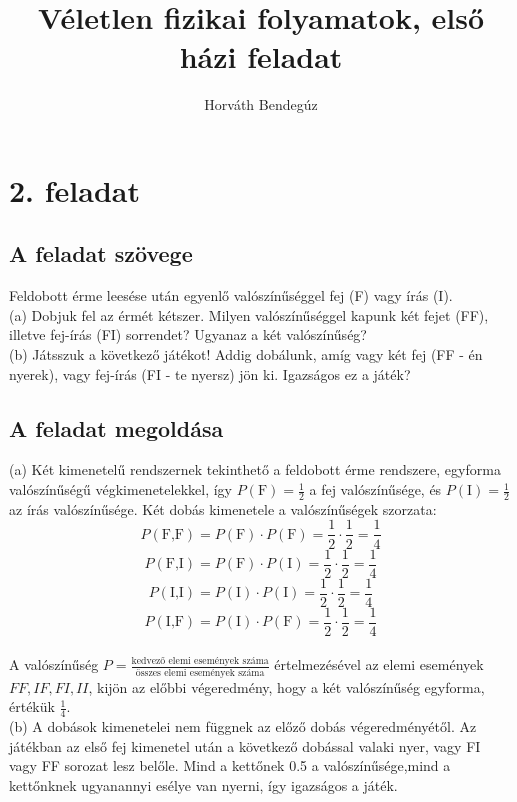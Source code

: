 \documentclass[12pt]{article}
\title{Véletlen fizikai folyamatok, első házi feladat}
\author{Horváth Bendegúz}
\begin{document}
 
 
\maketitle

\section*{2. feladat}
\subsection*{A feladat szövege}
Feldobott érme leesése után egyenlő valószínűséggel fej (F) vagy írás (I).
\\
(a) Dobjuk fel az érmét kétszer. Milyen valószínűséggel kapunk két fejet (FF), illetve fej-írás (FI) sorrendet? Ugyanaz a két valószínűség?
\\ 
(b) Játsszuk a következő játékot! Addig dobálunk, amíg vagy két fej (FF - én nyerek), vagy fej-írás (FI - te nyersz) jön ki. Igazságos ez a játék?
\subsection*{A feladat megoldása}
(a) Két kimenetelű rendszernek tekinthető a feldobott érme rendszere, egyforma valószínűségű végkimenetelekkel, így $P(\text{F}) = \frac{1}{2} $ a fej valószínűsége, és  $P(\text{I}) = \frac{1}{2} $ az írás valószínűsége. Két dobás kimenetele a valószínűségek szorzata: $$P(\text{F,F}) = P(\text{F})\cdot P(\text{F}) = \frac{1}{2}\cdot \frac{1}{2} = \frac{1}{4} $$
$$P(\text{F,I}) = P(\text{F})\cdot P(\text{I}) = \frac{1}{2}\cdot \frac{1}{2} = \frac{1}{4} $$
$$P(\text{I,I}) = P(\text{I})\cdot P(\text{I}) = \frac{1}{2}\cdot \frac{1}{2} = \frac{1}{4} $$
$$P(\text{I,F}) = P(\text{I})\cdot P(\text{F}) = \frac{1}{2}\cdot \frac{1}{2} = \frac{1}{4} $$
\\
A valószínűség $P = \frac{\text{kedvező elemi események száma}}{\text{összes elemi események száma}}$ értelmezésével az elemi események ${FF, IF, FI, II}$, kijön az előbbi végeredmény, hogy a két valószínűség egyforma, értékük $\frac{1}{4}$.\\
(b) A dobások kimenetelei nem függnek az előző dobás végeredményétől. Az játékban az első fej kimenetel után a következő dobással valaki nyer, vagy FI vagy FF sorozat lesz belőle. Mind a kettőnek 0.5 a valószínűsége,mind a kettőnknek ugyanannyi esélye van nyerni, így igazságos a játék.
\newpage
\end{document}
